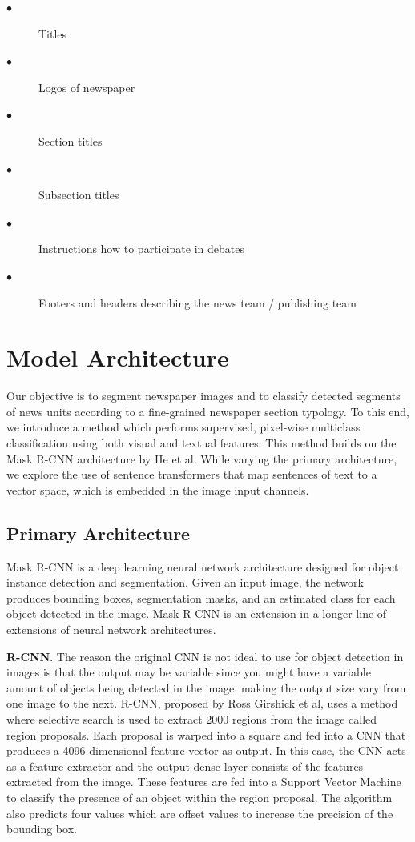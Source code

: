 \documentclass[english, bibtex]{kththesis}
\begin{document}
\begin{description}
\item[$\bullet$] Titles
\item[$\bullet$] Logos of newspaper
\item[$\bullet$] Section titles
\item[$\bullet$] Subsection titles
\item[$\bullet$] Instructions how to participate in debates
\item[$\bullet$] Footers and headers describing the news team / publishing team
\end{description}


\cleardoublepage

\chapter{Model Architecture}
\label{ch:modelarch}

Our objective is to segment newspaper images and to classify detected segments of news units according to a fine-grained newspaper section typology. To this end, we introduce a method which performs supervised, pixel-wise multiclass classification using both visual and textual features. This method builds on the Mask R-CNN architecture by He et al\cite{DBLP:journals/corr/HeGDG17}. While varying the primary architecture, we explore the use of sentence transformers that map sentences of text to a vector space, which is embedded in the image input channels.

\section{Primary Architecture}

Mask R-CNN is a deep learning neural network architecture designed for object instance detection and segmentation. Given an input image, the network produces bounding boxes, segmentation masks, and an estimated class for each object detected in the image. Mask R-CNN is an extension in a longer line of extensions of neural network architectures.

\textbf{R-CNN}. The reason the original CNN is not ideal to use for object detection in images is that the output may be variable since you might have a variable amount of objects being detected in the image, making the output size vary from one image to the next. R-CNN, proposed by Ross Girshick et al\cite{Girshick_2014_CVPR}, uses a method where selective search is used to extract 2000 regions from the image called region proposals. Each proposal is warped into a square and fed into a CNN that produces a 4096-dimensional feature vector as output. In this case, the CNN acts as a feature extractor and the output dense layer consists of the features extracted from the image. These features are fed into a Support Vector Machine to classify the presence of an object within the region proposal. The algorithm also predicts four values which are offset values to increase the precision of the bounding box.  
\end{document}

